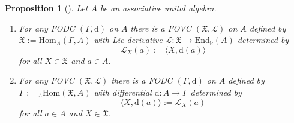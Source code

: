 \documentclass{article}
\newtheorem{proposition}[thm]{Proposition}
\theoremstyle{definition}
\newcommand{\beq}{\begin{equation}}
\newcommand{\eeq}{\end{equation}}
\begin{document}
	\begin{proposition}[{\cite[Theorem 2.5]{Bor96}}]\label{prop:duality}
		Let $A$ be an associative unital algebra.
		\begin{enumerate}
			\item[i.)] For any FODC $(\Gamma,\mathrm{d})$ on $A$ there is a FOVC $(\mathfrak{X},\mathscr{L})$ on $A$ defined by $\mathfrak{X}:=\mathrm{Hom}_A(\Gamma,A)$ with Lie derivative $\mathscr{L}\colon\mathfrak{X}\to\mathrm{End}_\Bbbk(A)$ determined by
			\beq\label{fodc-fovc}
			\mathscr{L}_X(a):=\langle X,\mathrm{d}(a)\rangle
			\eeq
			for all $X\in\mathfrak{X}$ and $a\in A$.
			
			\item[ii.)] For any FOVC $(\mathfrak{X},\mathscr{L})$ there is a FODC $(\Gamma,\mathrm{d})$ on $A$ defined by $\Gamma:={}_A\mathrm{Hom}(\mathfrak{X},A)$ with differential $\mathrm{d}\colon A\to\Gamma$ determined by
			$$
			\langle X,\mathrm{d}(a)\rangle:=\mathscr{L}_X(a)
			$$
			for all $a\in A$ and $X\in\mathfrak{X}$.
		\end{enumerate}
	\end{proposition}
\end{document}
